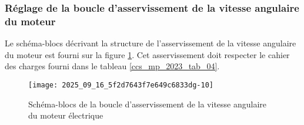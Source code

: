 \ifprof
\begin{corrige}
\end{corrige}
\else
\fi

\ifprof
\begin{corrige}
\end{corrige}
\else
\fi


\ifprof
\begin{corrige}
\end{corrige}
\else
\fi



%
\subsubsection{Réglage de la boucle d'asservissement de la vitesse angulaire du moteur}%
Le schéma-blocs décrivant la structure de l'asservissement de la vitesse angulaire du moteur est fourni sur la figure \ref{ccs_mp_2023_fig_12}. Cet asservissement doit respecter le cahier des charges fourni dans le tableau \ref{ccs_mp_2023_tab_04}.



\begin{figure}[!h]
\centering
\texttt{[image: 2025\_09\_16\_5f2d7643f7e649c6833dg-10]}
\caption{\label{ccs_mp_2023_fig_12}  Schéma-blocs de la boucle d'asservissement de la vitesse angulaire du moteur électrique}
\end{figure}




